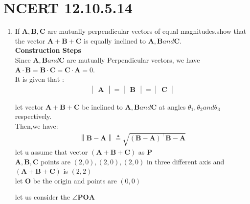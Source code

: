 \documentclass[12pt,-letter paper]{article}
\let\vec\mathbf{}
\let\vec\mathbf{}
\let\vec\mathbf{}
\providecommand{\brak}[1]{\ensuremath{\left(#1\right)}}
\providecommand{\norm}[1]{\left\lVert#1\right\rVert}
\newcommand{\mydet}[1]{\ensuremath{\begin{vmatrix}#1\end{vmatrix}}}
\begin{document}
\section*{NCERT 12.10.5.14}
\begin{enumerate}
    \item If $ \vec{A},\vec{B},\vec{C} $ are mutually perpendicular vectors of equal magnitudes,show that the vector $ \vec{A}+\vec{B}+\vec{C} $ is equally inclined to $ \vec{A},\vec{B} and \vec{C} $.\\
    
    \textbf{Construction Steps}\\
    
    Since $\vec{A},\vec{B} and \vec{C}$ are mutually Perpendicular vectors, we have $\vec{A} \cdot \vec{B}=\vec{B} \cdot \vec{C}=\vec{C} \cdot \vec{A}=0$.\\
    It is given that : 
    \begin{align*}
         \mydet{\vec{A}}=\mydet{\vec{B}}=\mydet{\vec{C}}
    \end{align*}
   
    let vector $\vec{A}+\vec{B}+\vec{C}$ be inclined to $\vec{A}, \vec{B} and \vec{C}$ at angles $\theta_1,\theta_2 and \theta_3$ respectively.\\
    
    Then,we have:\\

    \begin{align}
			\norm{\vec{B}-\vec{A}} \triangleq \sqrt{\brak{\vec{B}-\vec{A}}^{\top}{\vec{B}-\vec{A}}}
		\end{align}
    let u assume that vector $\brak{\vec{A}+\vec{B}+\vec{C}}$ as $\vec{P}$ \\

    
    $\vec{A},\vec{B},\vec{C}$ points are $\brak{2,0},\brak{2,0},\brak{2,0} $ in three different axis and $\brak{\vec{A}+\vec{B}+\vec{C}}$ is $\brak{2,2}$ \\

    
    let $\vec{O}$ be the origin and points are $\brak{0,0}$ 

    let us consider the $\angle \vec{POA}$ 
  

\end{enumerate}
\end{document}
